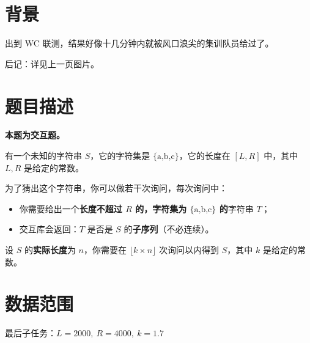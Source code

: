 \documentclass[a4paper,10pt]{article}
\begin{document}
\newpage

\section*{背景}

出到 WC 联测，结果好像十几分钟内就被风口浪尖的集训队员给过了。

后记：详见上一页图片。

\section*{题目描述}

\textbf{本题为交互题。}

有一个未知的字符串 $S$，它的字符集是 $\text{\{a,b,c\}}$，它的长度在 $[L,R]$ 中，其中 $L,R$ 是给定的常数。

为了猜出这个字符串，你可以做若干次询问，每次询问中：

\begin{itemize}
\item {你需要给出一个\textbf{长度不超过 $R$ 的，字符集为 $\text{\{a,b,c\}}$ 的}字符串 $T$；}

\item {交互库会返回：$T$ 是否是 $S$ 的\textbf{子序列}（不必连续）。}
\end{itemize}

设 $S$ 的\textbf{实际长度}为 $n$，你需要在 $\lfloor k\times n\rfloor$ 次询问以内得到 $S$，其中 $k$ 是给定的常数。

\section*{数据范围}

最后子任务：$L=2000,\ R=4000,\ k=1.7$

\newpage
\end{document}
